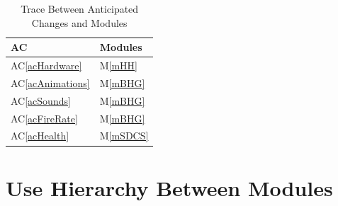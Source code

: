 \documentclass[12pt, titlepage]{article}
\newcommand{\acref}[1]{AC\ref{#1}}
\newcommand{\mref}[1]{M\ref{#1}}
\begin{document}
\begin{table}[H]
\centering
\begin{tabular}{p{} p{}}
\toprule
\textbf{AC} & \textbf{Modules}\\
\midrule
\acref{acHardware} & \mref{mHH}\\
\acref{acAnimations} & \mref{mBHG}\\
\acref{acSounds} & \mref{mBHG}\\
\acref{acFireRate} & \mref{mBHG}\\
\acref{acHealth} & \mref{mSDCS}\\
\bottomrule
\end{tabular}
\caption{Trace Between Anticipated Changes and Modules}
\label{TblACT}
\end{table}

\section{Use Hierarchy Between Modules} \label{SecUse}
\end{document}
